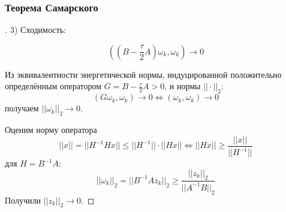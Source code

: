 \documentclass[10pt]{beamer}
\begin{document}
\begin{frame}[fragile]
\frametitle{Теорема Самарского}
\begin{proof}[]
3) Сходимость:

$$\left((B - \frac{\tau}{2} A) \omega_k, \omega_k\right) \to 0$$

Из эквивалентности энергетической нормы, индуцированной положительно определённым оператором $G = B - \frac{\tau}{2} A > 0 $, и нормы $||\cdot||_2$:
$$ (G \omega_k, \omega_k) \to 0 \Leftrightarrow (\omega_k, \omega_k) \to 0$$
получаем $||\omega_k||_2 \to 0$.

Оценим норму оператора
$$||x|| = ||H^{-1} H x|| \leqslant ||H^{-1}|| \cdot ||H x|| \Leftrightarrow ||H x|| \geqslant \frac{||x||}{||H^{-1}||}$$
для $H = B^{-1} A$:
$$||\omega_k||_2 = ||B^{-1} A z_k||_2 \geqslant \frac{||z_k||_2}{||A^{-1} B||_2}$$
Получили $||z_k||_2 \to 0$.
\end{proof}

\end{frame}
\end{document}
